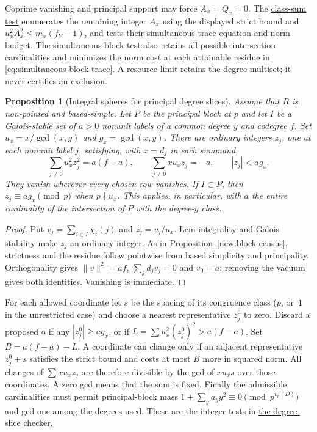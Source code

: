 \documentclass[11pt]{amsart}
\numberwithin{equation}{section}
\newtheorem{proposition}[theorem]{Proposition}
\theoremstyle{definition}
\theoremstyle{plain}
\newcommand{\supfile}[2]{\href{run:rank-bound-supplement/#1}{#2}}
\begin{document}
Coprime vanishing and principal support may force $A_x=Q_x=0$.
The \supfile{census/engine_src/degree_rows.py}{class-sum test}
enumerates the remaining integer $A_x$ using the displayed strict
bound and $u_x^2A_x^2\le m_x(f_Y-1)$, and tests their simultaneous
trace equation and norm budget. The
\supfile{census/arithmetic/block_trace.py}{simultaneous-block test} also
retains all possible intersection cardinalities and minimizes the
norm cost at each attainable residue in
\eqref{eq:simultaneous-block-trace}. A resource limit retains the
degree multiset; it never certifies an exclusion.

\begin{proposition}[Integral spheres for principal degree slices]\label{new:degree-slices}
Assume that $R$ is non-pointed and based-simple. Let $P$ be the
principal block at $p$ and let $I$ be a Galois-stable set of $a>0$
nonunit labels of a common degree $y$ and codegree $f$.
Set $u_x=x/\gcd(x,y)$ and $g_x=\gcd(x,y)$.
There are ordinary integers $z_j$, one at each nonunit label $j$,
satisfying, with $x=d_j$ in each summand,
\[
 \sum_{j\ne0}u_x^2 z_j^2=a(f-a),\qquad
 \sum_{j\ne0}x u_x z_j=-a,\qquad |z_j|<a g_x.
\]
They vanish wherever every chosen row vanishes.
If $I\subset P$, then $z_j\equiv a g_x\pmod p$ when $p\nmid u_x$.
This applies, in particular, with $a$ the entire cardinality of the
intersection of $P$ with the degree-$y$ class.
\end{proposition}
\begin{proof}
Put $v_j=\sum_{i\in I}\chi_i(j)$ and $z_j=v_j/u_x$.
Lcm integrality and Galois stability make $z_j$ an ordinary integer.
As in Proposition~\ref{new:block-census}, strictness and the residue
follow pointwise from based simplicity and principality.
Orthogonality gives $\|v\|^2=af$, $\sum_jd_jv_j=0$ and $v_0=a$;
removing the vacuum gives both identities. Vanishing is immediate.
\end{proof}

For each allowed coordinate let $s$ be the spacing of its congruence
class ($p$, or~$1$ in the unrestricted case) and choose a nearest
representative $z_j^0$ to zero. Discard a proposed $a$ if any
$|z_j^0|\ge a g_x$, or if
$L=\sum u_x^2(z_j^0)^2>a(f-a)$.
Set $B=a(f-a)-L$. A coordinate can change only if an adjacent
representative $z_j^0\pm s$ satisfies the strict bound and costs at
most $B$ more in squared norm. All changes of $\sum xu_xz_j$ are
therefore divisible by the gcd of $xu_xs$ over those coordinates.
A zero gcd means that the sum is fixed. Finally the admissible
cardinalities must permit principal-block mass
$1+\sum_y a_y y^2\equiv0\pmod{p^{v_p(D)}}$ and gcd one among the
degrees used. These are the integer tests in
\supfile{census/degree_slices.py}{the degree-slice checker}.
\end{document}
